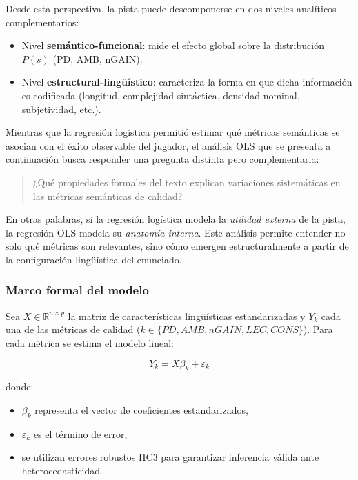 Desde esta perspectiva, la pista puede descomponerse en dos niveles analíticos complementarios:

\begin{itemize}
\item Nivel \textbf{semántico-funcional}: mide el efecto global sobre la distribución $P(s)$ (PD, AMB, nGAIN).
\item Nivel \textbf{estructural-lingüístico}: caracteriza la forma en que dicha información es codificada (longitud, complejidad sintáctica, densidad nominal, subjetividad, etc.).
\end{itemize}

Mientras que la regresión logística permitió estimar qué métricas semánticas se asocian con el éxito observable del jugador, el análisis OLS que se presenta a continuación busca responder una pregunta distinta pero complementaria:

\begin{quote}
¿Qué propiedades formales del texto explican variaciones sistemáticas en las métricas semánticas de calidad?
\end{quote}

En otras palabras, si la regresión logística modela la \textit{utilidad externa} de la pista, la regresión OLS modela su \textit{anatomía interna}. Este análisis permite entender no solo qué métricas son relevantes, sino cómo emergen estructuralmente a partir de la configuración lingüística del enunciado.

\subsubsection{Marco formal del modelo}

Sea $X \in \mathbb{R}^{n \times p}$ la matriz de características lingüísticas estandarizadas y $Y_k$ cada una de las métricas de calidad ($k \in \{PD, AMB, nGAIN, LEC, CONS\}$). Para cada métrica se estima el modelo lineal:

\[
Y_k = X\beta_k + \varepsilon_k
\]

donde:

\begin{itemize}
\item $\beta_k$ representa el vector de coeficientes estandarizados,
\item $\varepsilon_k$ es el término de error,
\item se utilizan errores robustos HC3 para garantizar inferencia válida ante heterocedasticidad.
\end{itemize}

